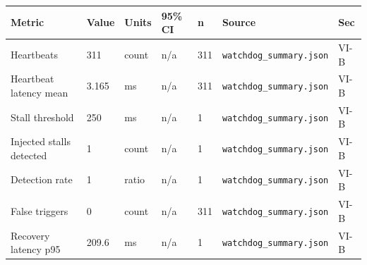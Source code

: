 \begin{tabular}{lllllll}
\hline
Metric & Value & Units & 95\% CI & n & Source & Sec \\
\hline
Heartbeats & 311 & count & n/a & 311 & \texttt{watchdog_summary.json} & VI-B \\
Heartbeat latency mean & 3.165 & ms & n/a & 311 & \texttt{watchdog_summary.json} & VI-B \\
Stall threshold & 250 & ms & n/a & 1 & \texttt{watchdog_summary.json} & VI-B \\
Injected stalls detected & 1 & count & n/a & 1 & \texttt{watchdog_summary.json} & VI-B \\
Detection rate & 1 & ratio & n/a & 1 & \texttt{watchdog_summary.json} & VI-B \\
False triggers & 0 & count & n/a & 311 & \texttt{watchdog_summary.json} & VI-B \\
Recovery latency p95 & 209.6 & ms & n/a & 1 & \texttt{watchdog_summary.json} & VI-B \\
\hline
\end{tabular}
